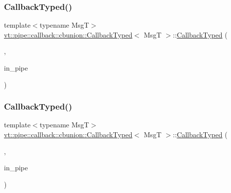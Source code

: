 \mbox{\label{structvt_1_1pipe_1_1callback_1_1cbunion_1_1_callback_typed_ad455eeb861c8abf6bfba2267dd389a7c}} 
\subsubsection{\texorpdfstring{Callback\+Typed()}{CallbackTyped()}\hspace{0.1cm}{\footnotesize\ttfamily [7/14]}}
{\footnotesize\ttfamily template$<$typename MsgT$>$ \\
\hyperlink{structvt_1_1pipe_1_1callback_1_1cbunion_1_1_callback_typed}{vt\+::pipe\+::callback\+::cbunion\+::\+Callback\+Typed}$<$ MsgT $>$\+::\hyperlink{structvt_1_1pipe_1_1callback_1_1cbunion_1_1_callback_typed}{Callback\+Typed} (\begin{DoxyParamCaption}\item[{Raw\+Send\+Col\+Msg\+Tag\+Type}]{,  }\item[{\hyperlink{namespacevt_ac9852acda74d1896f48f406cd72c7bd3}{Pipe\+Type} const \&}]{in\+\_\+pipe }\end{DoxyParamCaption})\hspace{0.3cm}{\ttfamily [inline]}}

\mbox{\label{structvt_1_1pipe_1_1callback_1_1cbunion_1_1_callback_typed_a4b5c8df6aa46634bde0318f7b8017123}} 
\subsubsection{\texorpdfstring{Callback\+Typed()}{CallbackTyped()}\hspace{0.1cm}{\footnotesize\ttfamily [8/14]}}
{\footnotesize\ttfamily template$<$typename MsgT$>$ \\
\hyperlink{structvt_1_1pipe_1_1callback_1_1cbunion_1_1_callback_typed}{vt\+::pipe\+::callback\+::cbunion\+::\+Callback\+Typed}$<$ MsgT $>$\+::\hyperlink{structvt_1_1pipe_1_1callback_1_1cbunion_1_1_callback_typed}{Callback\+Typed} (\begin{DoxyParamCaption}\item[{Raw\+Bcast\+Col\+Msg\+Tag\+Type}]{,  }\item[{\hyperlink{namespacevt_ac9852acda74d1896f48f406cd72c7bd3}{Pipe\+Type} const \&}]{in\+\_\+pipe }\end{DoxyParamCaption})\hspace{0.3cm}{\ttfamily [inline]}}

